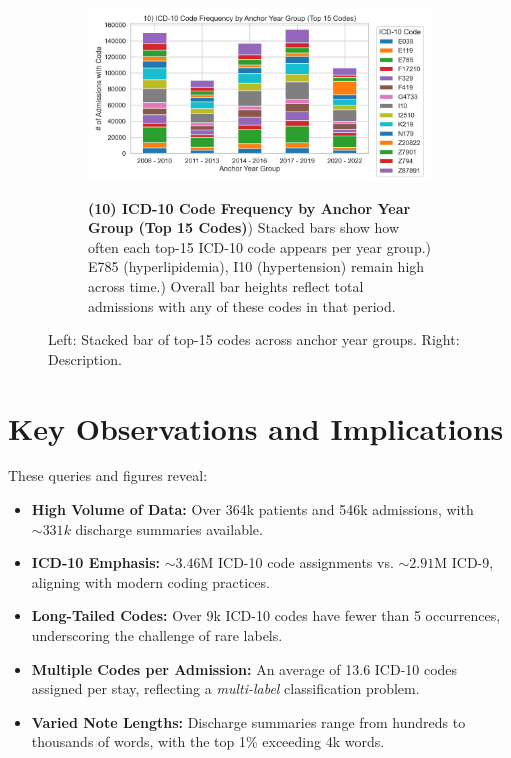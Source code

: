 \documentclass[12pt,a4paper]{report}
\begin{document}
\begin{figure}[ht!]
    \centering
    \begin{subfigure}{0.42\textwidth}
        \includegraphics[width=\linewidth]{mimic_plots/plot10.jpg}
    \end{subfigure}\hfill
    \begin{subfigure}{0.54\textwidth}
        \footnotesize
        \textbf{(10) ICD-10 Code Frequency by Anchor Year Group (Top 15 Codes)}) Stacked bars show how often each top-15 ICD-10 code appears per year group.) E785 (hyperlipidemia), I10 (hypertension) remain high across time.) Overall bar heights reflect total admissions with any of these codes in that period.
    \end{subfigure}
    \caption{Left: Stacked bar of top-15 codes across anchor year groups. Right: Description.}
    \label{fig:plot10}
\end{figure}

\section{Key Observations and Implications}
These queries and figures reveal:
\begin{itemize}
    \item \textbf{High Volume of Data:} Over 364k patients and 546k admissions, with \(\sim331k\) discharge summaries available.
    \item \textbf{ICD-10 Emphasis:} \(\sim3.46\)M ICD-10 code assignments vs. \(\sim2.91\)M ICD-9, aligning with modern coding practices.
    \item \textbf{Long-Tailed Codes:} Over 9k ICD-10 codes have fewer than 5 occurrences, underscoring the challenge of rare labels.
    \item \textbf{Multiple Codes per Admission:} An average of 13.6 ICD-10 codes assigned per stay, reflecting a \textit{multi-label} classification problem.
    \item \textbf{Varied Note Lengths:} Discharge summaries range from hundreds to thousands of words, with the top 1\% exceeding 4k words.
\end{itemize}
\end{document}
